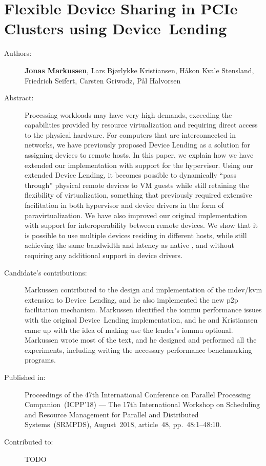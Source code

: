 \chapter{Flexible Device Sharing in PCIe Clusters using Device~Lending}
\label{paper:SRMPDS}
\paperthumb

\begin{description}
	\item[Authors:]
		\textbf{Jonas Markussen}, Lars Bj{\o}rlykke Kristiansen, H{\aa}kon Kvale Stensland,
		Friedrich Seifert, Carsten Griwodz, P{\aa}l Halvorsen

	\item[Abstract:]
		Processing workloads may have very high  demands, exceeding the capabilities provided by resource
		virtualization and requiring direct access to the physical hardware.
		For computers that are interconnected in  networks, we have previously proposed 
		Device Lending as a solution for assigning devices to remote hosts. In this paper, we
		explain how we have extended our implementation with support for the  hypervisor.
		Using our extended Device Lending, it becomes possible to dynamically ``pass through'' physical remote devices
		to VM guests while still retaining the flexibility of virtualization, something that previously required
		extensive facilitation in both hypervisor and device drivers in the form of \gls{paravirtualization}.
		We have also improved our original implementation with support for interoperability between remote devices.
		We show that it is possible to use multiple devices residing in different hosts, while still achieving the same
		bandwidth and latency as native , and without requiring any additional support in device drivers. 


	\item[Candidate's contributions:]
		Markussen contributed to the design and implementation of the \acrshort{mdev}/\acrshort{kvm} extension to Device~Lending,
		and he also implemented the new \acrshort{p2p} facilitation mechanism.
		Markussen identified the \acrshort{iommu} performance issues with the original Device~Lending implementation, and he and Kristiansen
		came up with the idea of making use the lender's \acrshort{iommu} optional.
		Markussen wrote most of the text, and he designed and performed all the experiments, including writing the necessary performance benchmarking 
		programs.

	\item[Published in:]
		Proceedings of the 47th International Conference on Parallel Processing Companion~(ICPP'18) ---
		The 17th International Workshop on Scheduling and Resource Management for Parallel and Distributed Systems~(SRMPDS),
		August~2018, article~48, pp.~48:1--48:10.

	\item[Contributed to:]
		TODO

\end{description}
